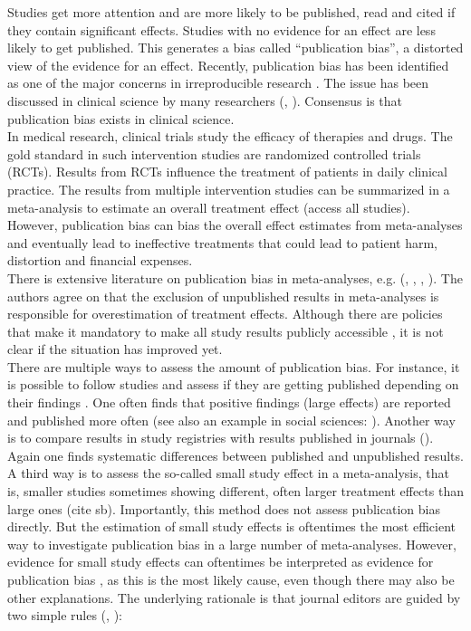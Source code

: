 \documentclass[11pt,a4paper,twoside]{book}\usepackage[]{graphicx}\usepackage[]{color}
\begin{document}
Studies get more attention and are more likely to be published, read and cited if they contain significant effects. Studies with no evidence for an effect are less likely to get published. This generates a bias called ``publication bias'', a distorted view of the evidence for an effect. Recently, publication bias has been identified as one of the major concerns in irreproducible research \citep{Bishop.2019}. The issue has been discussed in clinical science by many researchers (\citet{pb.clinicalscience1}, \citet{sterne2001}). Consensus is that publication bias exists in clinical science. \\
In medical research, clinical trials study the efficacy of therapies and drugs. The gold standard in such intervention studies are randomized controlled trials (RCTs). Results from RCTs influence the treatment of patients in daily clinical practice. The results from multiple intervention studies can be summarized in a meta-analysis to estimate an overall treatment effect (access all studies). However, publication bias can bias the overall effect estimates from meta-analyses and eventually lead to ineffective treatments that could lead to patient harm, distortion and financial expenses. \\
There is extensive literature on publication bias in meta-analyses, e.g. (\citet{pb.clinicalscience.2013}, %
\citet{grey.literature.4}, \citet{grey.literature.3}, \citet{grey.literature.2}).
The authors agree on that the exclusion of unpublished results in meta-analyses is responsible for overestimation of treatment effects. Although there are policies that make it mandatory to make all study results publicly accessible \citep{fda}, it is not clear if the situation has improved yet.\\
There are multiple ways to assess the amount of publication bias. For instance, it is possible to follow studies and assess if they are getting published depending on their findings \citep{publication.fate}. One often finds that positive findings (\ie large effects) are reported and published more often (see also an example in social sciences: \citet{social.sciences.publication.bias}). Another way is to compare results in study registries with results published in journals (\eg \citet{pb.clinicalscience.2013}). Again one finds systematic differences between published and unpublished results. \\
A third way is to assess the so-called small study effect in a meta-analysis, that is, smaller studies sometimes showing different, often larger treatment effects than large ones (cite sb). Importantly, this method does not assess publication bias directly. But the estimation of small study effects is oftentimes the most efficient way to investigate publication bias in a large number of meta-analyses. However, evidence for small study effects can oftentimes be interpreted as evidence for publication bias \citep{Egger}, as this is the most likely cause, even though there may also be other explanations. The underlying rationale is that journal editors are guided by two simple rules (\citet{excess.significance}, \citet{ioannidis.2019}): 
\end{document}
